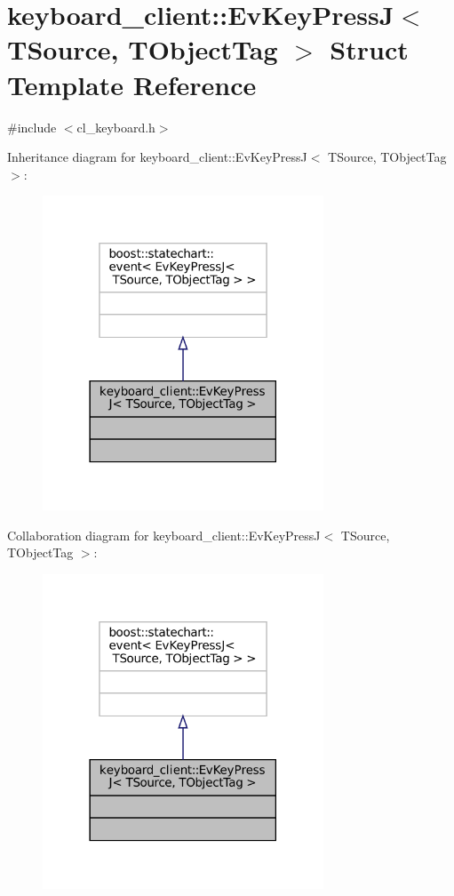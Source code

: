 \hypertarget{structkeyboard__client_1_1EvKeyPressJ}{}\section{keyboard\+\_\+client\+:\+:Ev\+Key\+PressJ$<$ T\+Source, T\+Object\+Tag $>$ Struct Template Reference}
\label{structkeyboard__client_1_1EvKeyPressJ}


{\ttfamily \#include $<$cl\+\_\+keyboard.\+h$>$}



Inheritance diagram for keyboard\+\_\+client\+:\+:Ev\+Key\+PressJ$<$ T\+Source, T\+Object\+Tag $>$\+:
\nopagebreak
\begin{figure}[H]
\begin{center}
\leavevmode
\includegraphics[width=237pt]{structkeyboard__client_1_1EvKeyPressJ__inherit__graph}
\end{center}
\end{figure}


Collaboration diagram for keyboard\+\_\+client\+:\+:Ev\+Key\+PressJ$<$ T\+Source, T\+Object\+Tag $>$\+:
\nopagebreak
\begin{figure}[H]
\begin{center}
\leavevmode
\includegraphics[width=237pt]{structkeyboard__client_1_1EvKeyPressJ__coll__graph}
\end{center}
\end{figure}


